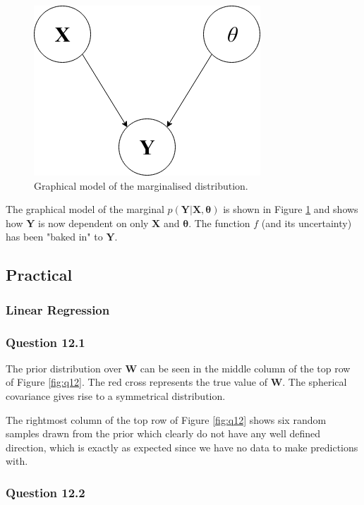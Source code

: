 \documentclass[10pt, a4paper, twocolumn]{article} %
\begin{document}
\begin{figure}[htbp]
\centerline{\includegraphics[width=0.5\linewidth]{question_11.png}}
\caption{Graphical model of the marginalised distribution.}
\label{fig:q11}
\end{figure}

The graphical model of the marginal $p(\mathbf{Y|X,\theta})$ is shown in Figure \ref{fig:q11} and shows how $\mathbf{Y}$ is now dependent on only $\mathbf{X}$ and $\mathbf{\theta}$.  The function $f$ (and its uncertainty) has been "baked in" to $\mathbf{Y}$.

\subsection{Practical}
\subsubsection{Linear Regression}
\subsubsection*{Question 12.1}

The prior distribution over $\mathbf{W}$ can be seen in the middle column of the top row of Figure \ref{fig:q12}. The red cross represents the true value of $\mathbf{W}$. The spherical covariance gives rise to a symmetrical distribution.

The rightmost column of the top row of Figure \ref{fig:q12} shows six random samples drawn from the prior which clearly do not have any well defined direction, which is exactly as expected since we have no data to make predictions with.

\subsubsection*{Question 12.2}
\end{document}
